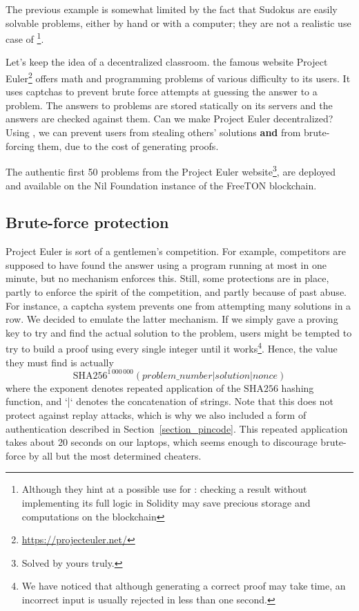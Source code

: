 \documentclass[10pt,a4paper]{article}
\begin{document}
The previous example is somewhat limited by the fact that Sudokus are easily solvable problems, either by hand or with a computer; they are not a realistic use case of \zksnarks{}\footnote{Although they hint at a possible use for \zksnarks{}: checking a result without implementing its full logic in Solidity may save precious storage and computations on the blockchain}.

Let's keep the idea of a decentralized classroom. the famous website Project Euler\footnote{\url{https://projecteuler.net/}} offers math and programming problems of various difficulty to its users. It uses captchas to prevent brute force attempts at guessing the answer to a problem. The answers to problems are stored statically on its servers and the answers are checked against them. Can we make Project Euler decentralized? Using \zksnarks{}, we can prevent users from stealing others' solutions \textbf{and} from brute-forcing them, due to the cost of generating proofs.

The authentic first 50 problems from the Project Euler website\footnote{Solved by yours truly.}, are deployed and available on the Nil Foundation instance of the FreeTON blockchain.

\subsection{Brute-force protection}
\label{subsec:brute-force}

Project Euler is sort of a gentlemen's competition. For example, competitors are supposed to have found the answer using a program running at most in one minute, but no mechanism enforces this. Still, some protections are in place, partly to enforce the spirit of the competition, and partly because of past abuse. For instance, a captcha system prevents one from attempting many solutions in a row. We decided to emulate the latter mechanism. If we simply gave a proving key to try and find the actual solution to the problem, users might be tempted to try to build a proof using every single integer until it works\footnote{We have noticed that although generating a correct proof may take time, an incorrect input is usually rejected in less than one second.}. Hence, the value they must find is actually
\[ \textrm{SHA256}^{1\,000\,000}\left(problem\_number | solution | nonce\right)\]
where the exponent denotes repeated application of the $\textrm{SHA256}$ hashing function, and `|` denotes the concatenation of strings. Note that this does not protect against replay attacks, which is why we also included a form of authentication described in Section~\ref{section_pincode}. This repeated application takes about 20 seconds on our laptops, which seems enough to discourage brute-force by all but the most determined cheaters.
\end{document}
